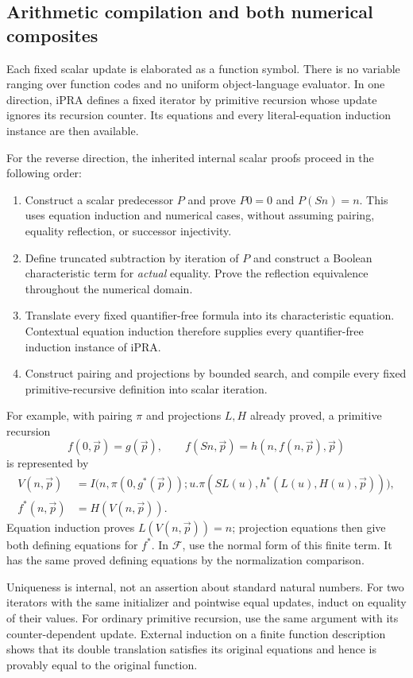 \subsection{Arithmetic compilation and both numerical composites}

Each fixed scalar update is elaborated as a function symbol.
There is no variable ranging over function codes and no uniform
object-language evaluator. In one direction, iPRA defines a fixed
iterator by primitive recursion whose update ignores its recursion
counter. Its equations and every literal-equation induction instance
are then available.

For the reverse direction, the inherited internal scalar proofs proceed
in the following order:
\begin{enumerate}
\item Construct a scalar predecessor $P$ and prove $P0=0$ and $P(Sn)=n$.
This uses equation induction and numerical cases, without assuming
pairing, equality reflection, or successor injectivity.
\item Define truncated subtraction by iteration of $P$ and construct a
Boolean characteristic term for \emph{actual} equality. Prove the
reflection equivalence throughout the numerical domain.
\item Translate every fixed quantifier-free formula into its
characteristic equation. Contextual equation induction therefore
supplies every quantifier-free induction instance of iPRA.
\item Construct pairing and projections by bounded search, and compile
every fixed primitive-recursive definition into scalar iteration.
\end{enumerate}

For example, with pairing $\pi$ and projections $L,H$ already proved,
a primitive recursion
\[
 f(0,\vec p)=g(\vec p),\qquad
 f(Sn,\vec p)=h(n,f(n,\vec p),\vec p)
\]
is represented by
\[
\begin{aligned}
 V(n,\vec p)&=
 I\bigl(n,\pi(0,g^*(\vec p));
 u.\pi(SL(u),h^*(L(u),H(u),\vec p))\bigr),\\
 f^*(n,\vec p)&=H(V(n,\vec p)).
\end{aligned}
\]
Equation induction proves $L(V(n,\vec p))=n$; projection equations
then give both defining equations for $f^*$. In $\mathcal F$, use
the normal form of this finite term. It has the same proved
defining equations by the normalization comparison.

Uniqueness is internal, not an assertion about standard natural numbers.
For two iterators with the same initializer and pointwise equal updates,
induct on equality of their values. For ordinary primitive recursion,
use the same argument with its counter-dependent update. External
induction on a finite function description shows that its double
translation satisfies its original equations and hence is provably
equal to the original function.

